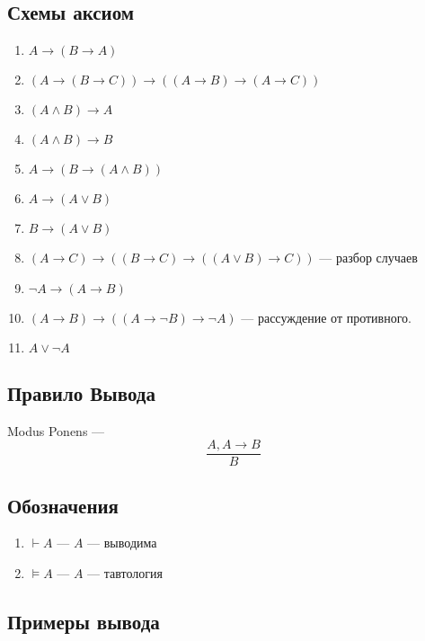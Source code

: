 \subsection{Схемы аксиом}
\begin{enumerate}
    \item $A \rightarrow (B \rightarrow A)$
    \item $(A \rightarrow (B \rightarrow C)) \rightarrow ((A \rightarrow B) \rightarrow (A \rightarrow C))$
    \item $(A\wedge B) \rightarrow A$
    \item $(A\wedge B) \rightarrow B$
    \item $A \rightarrow (B \rightarrow (A\wedge B))$
    \item $A \rightarrow (A \vee B)$
    \item $B \rightarrow (A \vee B)$
    \item $(A\rightarrow C) \rightarrow ((B \rightarrow C )\rightarrow ((A\vee B) \rightarrow C))$ --- разбор случаев
    \item $\neg A \rightarrow (A \rightarrow B)$
    \item $(A \rightarrow B) \rightarrow ((A \rightarrow \neg B) \rightarrow \neg A)$ --- рассуждение от противного.
    \item $A\vee\neg A$
\end{enumerate}
\subsection{Правило Вывода}
\begin{definition}
    Modus Ponens ---
    $$\frac{A, A\rightarrow B}{B}$$
\end{definition}

\subsection{Обозначения}
\begin{enumerate}
    \item $\vdash A$ --- $A$ --- выводима
    \item $\models A$ --- $A$ --- тавтология
\end{enumerate}

\subsection{Примеры вывода}

